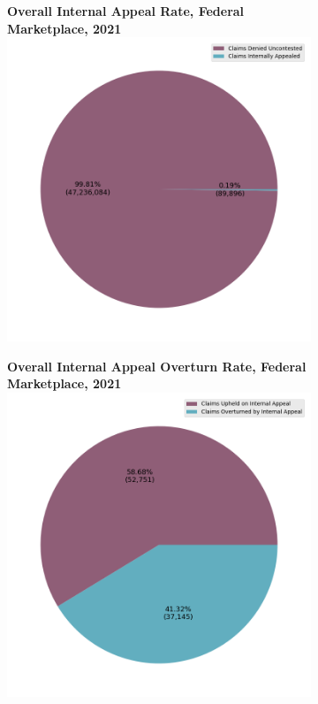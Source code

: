\documentclass[12pt, a4paper,twoside]{report}
\theoremstyle{plain} %
\theoremstyle{definition} %
\theoremstyle{remark} %
\numberwithin{equation}{chapter}
\begin{document}
	
	
	\begin{figure}[h!]
		\centering
		\begin{subfigure}[b]{0.49\textwidth}
			\centering
			\textbf{Overall Internal Appeal Rate, Federal Marketplace, 2021}
			\includegraphics[width=\textwidth]{images/cms_puf/internal_appeal_rates_all_insurers.png}
		\end{subfigure}
		\hfill
		\begin{subfigure}[b]{0.49\textwidth}
			\centering
			\textbf{Overall Internal Appeal Overturn Rate, Federal Marketplace, 2021}
			\includegraphics[width=\textwidth]{images/cms_puf/internal_appeal_success_rates_all_insurers.png}

\end{subfigure}
\end{figure}
\end{document}
